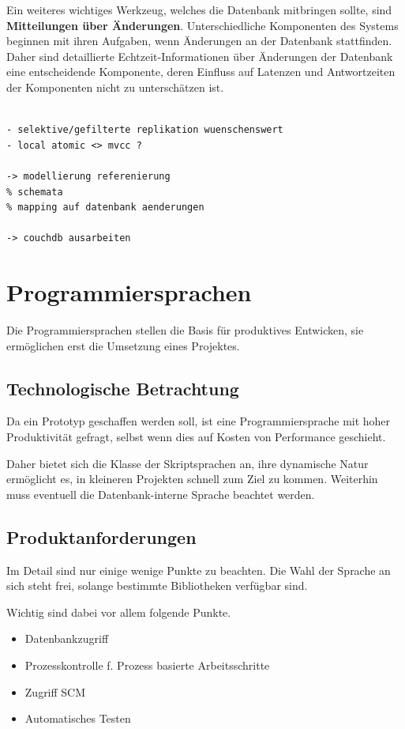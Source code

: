 Ein weiteres wichtiges Werkzeug, welches die Datenbank mitbringen sollte, sind \textbf{Mitteilungen über Änderungen}.
Unterschiedliche Komponenten des Systems beginnen mit ihren Aufgaben,
wenn Änderungen an der Datenbank stattfinden.
Daher sind detaillierte Echtzeit-Informationen über Änderungen der Datenbank eine entscheidende Komponente,
deren Einfluss auf Latenzen und Antwortzeiten der Komponenten nicht zu unterschätzen ist.


\begin{verbatim}

- selektive/gefilterte replikation wuenschenswert
- local atomic <> mvcc ?

-> modellierung referenierung
% schemata
% mapping auf datenbank aenderungen

-> couchdb ausarbeiten

\end{verbatim}


\section{Programmiersprachen}

Die Programmiersprachen stellen die Basis f\"ur produktives Entwicken,
sie erm\"oglichen erst die Umsetzung eines Projektes.

\subsection{Technologische Betrachtung}

Da ein Prototyp geschaffen werden soll,
ist eine Programmiersprache mit hoher Produktivit\"at gefragt,
selbst wenn dies auf Kosten von Performance geschieht.

Daher bietet sich die Klasse der Skriptsprachen an,
ihre dynamische Natur ermöglicht es,
in kleineren Projekten schnell zum Ziel zu kommen.
Weiterhin muss eventuell die Datenbank-interne Sprache beachtet werden.


\subsection{Produktanforderungen}

Im Detail sind nur einige wenige Punkte zu beachten.
Die Wahl der Sprache an sich steht frei,
solange bestimmte Bibliotheken verf\"ugbar sind.

Wichtig sind dabei vor allem folgende Punkte.
\begin{itemize}
    \item Datenbankzugriff 
    \item Prozesskontrolle f. Prozess basierte Arbeitsschritte
    \item Zugriff SCM
    \item Automatisches Testen
\end{itemize}

